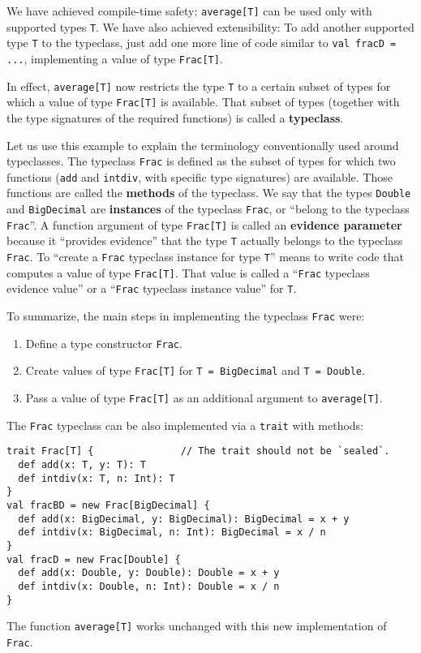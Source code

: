 We have achieved compile-time safety: \lstinline!average[T]! can
be used only with supported types \lstinline!T!. We have also achieved
extensibility: To add another supported type \lstinline!T! to the
typeclass, just add one more line of code similar to \lstinline!val fracD = ...!,
implementing a value of type \lstinline!Frac[T]!.

In effect, \lstinline!average[T]! now restricts the type \lstinline!T!
to a certain subset of types for which a value of type \lstinline!Frac[T]!
is available. That subset of types (together with the type signatures
of the required functions) is called a \textbf{typeclass}.

Let us use this example to explain the terminology conventionally
used around typeclasses. The typeclass \lstinline!Frac! is defined
as the subset of types for which two functions (\lstinline!add! and
\lstinline!intdiv!, with specific type signatures) are available.
Those functions are called the \textbf{methods} of the typeclass.
We say that the types \lstinline!Double! and \lstinline!BigDecimal!
are \textbf{instances} of the typeclass \lstinline!Frac!, or \textsf{``}belong
to the typeclass \lstinline!Frac!\textsf{''}. A function argument of type
\lstinline!Frac[T]! is called an \textbf{evidence parameter}
because it \textsf{``}provides evidence\textsf{''} that the type \lstinline!T! actually
belongs to the typeclass \lstinline!Frac!. To \textsf{``}create a \lstinline!Frac!
typeclass instance for type \lstinline!T!\textsf{''} means to write code
that computes a value of type \lstinline!Frac[T]!. That value is
called a \textsf{``}\lstinline!Frac! typeclass evidence value\textsf{''} or a \textsf{``}\lstinline!Frac!
typeclass instance value\textsf{''} for \lstinline!T!.

To summarize, the main steps in implementing the typeclass \lstinline!Frac!
were:
\begin{enumerate}
\item Define a type constructor \lstinline!Frac!.
\item Create values of type \lstinline!Frac[T]! for \lstinline!T = BigDecimal!
and \lstinline!T = Double!.
\item Pass a value of type \lstinline!Frac[T]! as an additional argument
to \lstinline!average[T]!.
\end{enumerate}
The \lstinline!Frac! typeclass can be also implemented via a \lstinline!trait!
with methods:
\begin{lstlisting}
trait Frac[T] {               // The trait should not be `sealed`.
  def add(x: T, y: T): T
  def intdiv(x: T, n: Int): T
}
val fracBD = new Frac[BigDecimal] {
  def add(x: BigDecimal, y: BigDecimal): BigDecimal = x + y
  def intdiv(x: BigDecimal, n: Int): BigDecimal = x / n
}
val fracD = new Frac[Double] {
  def add(x: Double, y: Double): Double = x + y
  def intdiv(x: Double, n: Int): Double = x / n
}
\end{lstlisting}
The function \lstinline!average[T]! works unchanged with this new
implementation of \lstinline!Frac!.

